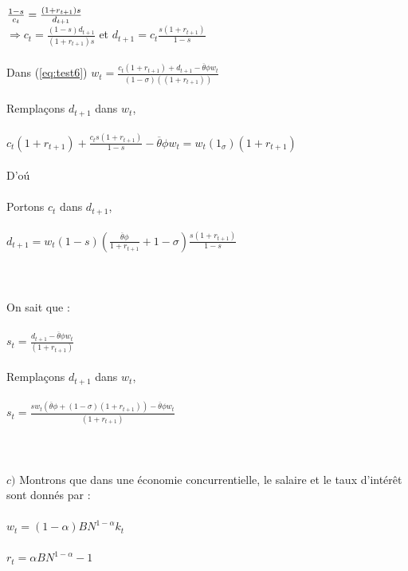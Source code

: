 \documentclass[11pt,twoside,a4paper]{article}
\begin{document}
$\\
\frac{1-s}{c_t} = \frac{(1+r_{t+1})s}{ d_{t+1}}\\
$\\
$ \Rightarrow c_t= \frac{(1-s)d_{t+1}}{(1+r_{t+1})s}$  \: et \: $ d_{t+1}=c_t \frac{ s{(1+r_{t+1})}}{1-s}$\\ \\
Dans (\ref{eq:test6})\: $ w_t = \frac{c_t(1+r_{t+1}) + d_{t+1}-\overline{\theta}\phi w_t}{(1-\sigma)((1+r_{t+1}))}$\\ \\
Rempla\c{c}ons $d_{t+1}$ dans $w_t$, \\ \\
$c_t(1+r_{t+1})+\frac{c_t s{(1+r_{t+1})}}{1-s}-\overline{\theta}\phi w_t= w_t(1_\sigma)(1+r_{t+1})$ \\ \\
D'o\'{u} \:
  \\ \\ 
 Portons $c_t$ dans $d_{t+1}$, \\ \\
 $ d_{t+1}= w_t(1-s)(\frac{\overline{\theta}\phi}{1+r_{t+1}} +1- \sigma )\frac{ s{(1+r_{t+1})}}{1-s}$ \\ \\
\\ \\
 On sait que :  \\ \\
 $s_t=\frac{d_{t+1}-\overline{\theta}\phi w_t}{(1+r_{t+1})}$\\ \\ 
 Rempla\c{c}ons $d_{t+1}$ dans $w_t$, \\ \\
  $s_t=\frac{s w_t\left(\overline{\theta}\phi +(1- \sigma)(1+r_{t+1}) \right)-\overline{\theta}\phi w_t}{(1+r_{t+1})}$\\ \\
\\ \\
$c)$ Montrons que dans une économie concurrentielle, le salaire et le taux d'intér\^{e}t sont donnés par :\\ \\
$w_t=(1-\alpha)BN^{1-\alpha}k_t$\\ \\
$r_t=\alpha BN^{1-\alpha}-1$\\ \\
\end{document}
